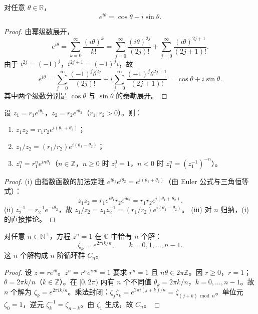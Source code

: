 \begin{theorem}[Euler 公式]\label{thm:ca_euler_formula}
对任意 $\theta \in \mathbb{R}$，
\[
e^{i\theta} = \cos\theta + i \sin\theta.
\]
\end{theorem}

\begin{proof}
由幂级数展开，
\[
e^{i\theta} = \sum_{k=0}^{\infty} \frac{(i\theta)^k}{k!} = \sum_{j=0}^{\infty} \frac{(i\theta)^{2j}}{(2j)!} + \sum_{j=0}^{\infty} \frac{(i\theta)^{2j+1}}{(2j+1)!}.
\]
由于 $i^{2j} = (-1)^j$，$i^{2j+1} = (-1)^j i$，故
\[
e^{i\theta} = \sum_{j=0}^{\infty} \frac{(-1)^j \theta^{2j}}{(2j)!} + i \sum_{j=0}^{\infty} \frac{(-1)^j \theta^{2j+1}}{(2j+1)!} = \cos\theta + i \sin\theta.
\]
其中两个级数分别是 $\cos\theta$ 与 $\sin\theta$ 的泰勒展开。
\end{proof}

\begin{proposition}[极坐标下的乘法与除法]\label{prop:ca_polar_multiplication}
设 $z_1 = r_1 e^{i\theta_1}$，$z_2 = r_2 e^{i\theta_2}$（$r_1, r_2 > 0$）。则：
\begin{enumerate}[label=(\roman*)]
    \item $z_1 z_2 = r_1 r_2 e^{i(\theta_1 + \theta_2)}$；
    \item $z_1 / z_2 = (r_1/r_2) e^{i(\theta_1 - \theta_2)}$；
    \item $z_1^n = r_1^n e^{in\theta_1}$（$n \in \mathbb{Z}$，$n \ge 0$ 时 $z_1^0 = 1$，$n < 0$ 时 $z_1^n = (z_1^{-1})^{-n}$）。
\end{enumerate}
\end{proposition}

\begin{proof}
(i) 由指数函数的加法定理 $e^{i\theta_1} e^{i\theta_2} = e^{i(\theta_1 + \theta_2)}$（由 Euler 公式与三角恒等式）：
\[
z_1 z_2 = r_1 e^{i\theta_1} r_2 e^{i\theta_2} = r_1 r_2 e^{i(\theta_1 + \theta_2)}.
\]
(ii) $z_2^{-1} = r_2^{-1} e^{-i\theta_2}$，故 $z_1 / z_2 = z_1 z_2^{-1} = (r_1/r_2) e^{i(\theta_1 - \theta_2)}$。
(iii) 对 $n$ 归纳，(i) 的直接推论。
\end{proof}

\begin{theorem}[单位根群]\label{thm:ca_unit_roots}
对任意 $n \in \mathbb{N}^+$，方程 $z^n = 1$ 在 $\mathbb{C}$ 中恰有 $n$ 个解：
\[
\zeta_k = e^{2\pi i k/n}, \qquad k = 0, 1, \dots, n-1.
\]
这 $n$ 个解构成 $n$ 阶循环群 $C_n$。
\end{theorem}

\begin{proof}
设 $z = re^{i\theta}$。$z^n = r^n e^{in\theta} = 1$ 要求 $r^n = 1$ 且 $n\theta \in 2\pi\mathbb{Z}$。因 $r \ge 0$，$r = 1$；$\theta = 2\pi k/n$（$k \in \mathbb{Z}$）。在 $[0, 2\pi)$ 内有 $n$ 个不同值 $\theta_k = 2\pi k/n$，$k = 0, \dots, n-1$。故 $n$ 个解为 $\zeta_k = e^{2\pi i k/n}$。乘法封闭：$\zeta_j \zeta_k = e^{2\pi i(j+k)/n} = \zeta_{(j+k) \bmod n}$。单位元 $\zeta_0 = 1$，逆元 $\zeta_k^{-1} = \zeta_{n-k}$。由 $\zeta_1$ 生成，故 $C_n$。
\end{proof}

